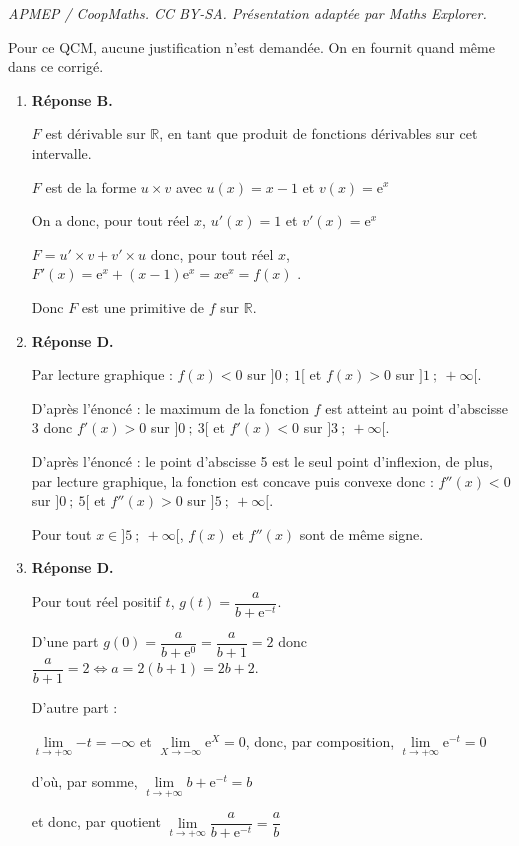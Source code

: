 \documentclass[10pt]{article}
\providecommand{\R}{\mathbb{R}}
\begin{document}
\noindent\textit{APMEP / CoopMaths. CC BY-SA. Présentation adaptée par Maths Explorer.}\par\medskip
\bigskip
Pour ce QCM, aucune justification n'est demandée. On en fournit quand même dans ce corrigé.
\begin{enumerate}
\item \textbf{Réponse B.}

$F$ est dérivable sur $\R $, en tant que produit de fonctions dérivables sur cet intervalle.

$F$ est de la forme $u \times v$ avec $u(x)=x-1$ et $v(x)=\mathrm{e}^x$

On a donc, pour tout réel $x$,  $u'(x)=1$ et $v'(x)	=\mathrm{e}^x$

$F= u'\times v + v'\times u$ donc,  pour tout réel $x$, $F'(x) = \mathrm{e}^x+ (x-1) \mathrm{e}^x = x\mathrm{e}^x=f(x)$ .

Donc $F$ est une primitive de $f$ sur $\R$.
\item \textbf{Réponse D.}

Par lecture graphique : $f(x)<0$ sur $]0~;~1[$ et $f(x)>0$ sur $]1~;~+\infty[$.

D'après l'énoncé : le maximum de la fonction $f$ est atteint au point d'abscisse 3  donc $f'(x)>0$ sur $]0~;~3[$ et $f'(x) <0$ sur $]3~;~+\infty[$.

D'après l'énoncé : le point d'abscisse 5 est le seul point d'inflexion, de plus,  par lecture  graphique,  la fonction est concave puis convexe donc : $f''(x)<0$ sur $]0~;~5[$ et $f''(x) >0$ sur $]5~;~+\infty[$.



Pour tout $x \in ]5~;~+\infty[$, $f(x)$ et $f''(x)$ sont de même signe.

\item \textbf{Réponse D.}

Pour tout réel positif $t$, $g(t)=\dfrac{a}{b+\mathrm{e}^{-t}}$.

D'une part  $g(0)=\dfrac{a}{b+\mathrm{e}^0}=\dfrac{a}{b+1}=2$ donc $\dfrac{a}{b+1}=2 \iff a=2(b+1)=2b+2$.

D'autre part :

$\lim\limits_{t \to +\infty}{-t}=-\infty$ et $\lim\limits_{X\to -\infty}{\mathrm{e}^X}=0$, donc, par composition, $\lim\limits_{t\to +\infty}{ \mathrm{e}^{-t}}=0$

d'où, par somme, $\lim\limits_{t\to +\infty} b+ \mathrm{e}^{-t}=b$

et donc, par quotient $\lim\limits_{t\to +\infty}\dfrac{a}{b+\mathrm{e}^{-t}}=\dfrac{a}{b}$


\end{enumerate}
\end{document}
